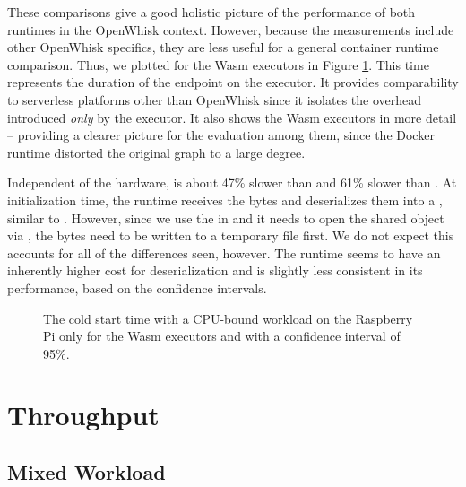 These comparisons give a good holistic picture of the performance of both runtimes in the OpenWhisk context. However, because the measurements include other OpenWhisk specifics, they are less useful for a general container runtime comparison. Thus, we plotted  for the Wasm executors in Figure \ref{fig:pc-pi-cold-start-wasm-only}. This time represents the duration of the  endpoint on the executor. It provides comparability to serverless platforms other than OpenWhisk since it isolates the overhead introduced \emph{only} by the executor. It also shows the Wasm executors in more detail -- providing a clearer picture for the evaluation among them, since the Docker runtime distorted the original graph to a large degree.

Independent of the hardware,  is about 47\% slower than  and 61\% slower than . At initialization time, the runtime receives the bytes and deserializes them into a , similar to . However, since we use the  in  and it needs to open the shared object via , the bytes need to be written to a temporary file first. We do not expect this accounts for all of the differences seen, however.
The runtime seems to have an inherently higher cost for deserialization and is slightly less consistent in its performance, based on the confidence intervals.

\begin{figure}
    \begin{center}
        
    \end{center}
    \caption{The cold start time with a CPU-bound workload on the Raspberry Pi only for the Wasm executors and with a confidence interval of 95\%.}
    \label{fig:pc-pi-cold-start-wasm-only}
\end{figure}



\section{Throughput}

\subsection{Mixed Workload}

